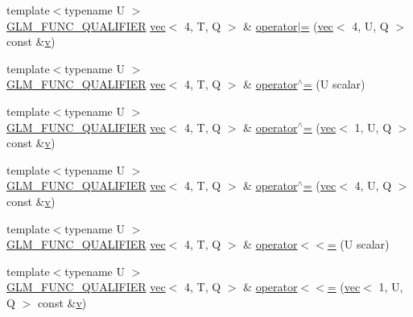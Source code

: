 \begin{DoxyCompactItemize}
\item 
{\footnotesize template$<$typename U $>$ }\\\hyperlink{setup_8hpp_a33fdea6f91c5f834105f7415e2a64407}{G\+L\+M\+\_\+\+F\+U\+N\+C\+\_\+\+Q\+U\+A\+L\+I\+F\+I\+ER} \hyperlink{structglm_1_1vec}{vec}$<$ 4, T, Q $>$ \& \hyperlink{structglm_1_1vec_3_014_00_01_t_00_01_q_01_4_aea8bc26beedb4f4fbb6a4d0ad4e02a86}{operator$\vert$=} (\hyperlink{structglm_1_1vec}{vec}$<$ 4, U, Q $>$ const \&\hyperlink{_s_d_l__opengl_8h_a10a82eabcb59d2fcd74acee063775f90}{v})
\item 
{\footnotesize template$<$typename U $>$ }\\\hyperlink{setup_8hpp_a33fdea6f91c5f834105f7415e2a64407}{G\+L\+M\+\_\+\+F\+U\+N\+C\+\_\+\+Q\+U\+A\+L\+I\+F\+I\+ER} \hyperlink{structglm_1_1vec}{vec}$<$ 4, T, Q $>$ \& \hyperlink{structglm_1_1vec_3_014_00_01_t_00_01_q_01_4_a123f810174d23a4d1b1eaf299a4e6f51}{operator$^\wedge$=} (U scalar)
\item 
{\footnotesize template$<$typename U $>$ }\\\hyperlink{setup_8hpp_a33fdea6f91c5f834105f7415e2a64407}{G\+L\+M\+\_\+\+F\+U\+N\+C\+\_\+\+Q\+U\+A\+L\+I\+F\+I\+ER} \hyperlink{structglm_1_1vec}{vec}$<$ 4, T, Q $>$ \& \hyperlink{structglm_1_1vec_3_014_00_01_t_00_01_q_01_4_a926de242b3187323bfc98e42863c23d3}{operator$^\wedge$=} (\hyperlink{structglm_1_1vec}{vec}$<$ 1, U, Q $>$ const \&\hyperlink{_s_d_l__opengl_8h_a10a82eabcb59d2fcd74acee063775f90}{v})
\item 
{\footnotesize template$<$typename U $>$ }\\\hyperlink{setup_8hpp_a33fdea6f91c5f834105f7415e2a64407}{G\+L\+M\+\_\+\+F\+U\+N\+C\+\_\+\+Q\+U\+A\+L\+I\+F\+I\+ER} \hyperlink{structglm_1_1vec}{vec}$<$ 4, T, Q $>$ \& \hyperlink{structglm_1_1vec_3_014_00_01_t_00_01_q_01_4_adfc4f1060841f2652c19c17d9980019a}{operator$^\wedge$=} (\hyperlink{structglm_1_1vec}{vec}$<$ 4, U, Q $>$ const \&\hyperlink{_s_d_l__opengl_8h_a10a82eabcb59d2fcd74acee063775f90}{v})
\item 
{\footnotesize template$<$typename U $>$ }\\\hyperlink{setup_8hpp_a33fdea6f91c5f834105f7415e2a64407}{G\+L\+M\+\_\+\+F\+U\+N\+C\+\_\+\+Q\+U\+A\+L\+I\+F\+I\+ER} \hyperlink{structglm_1_1vec}{vec}$<$ 4, T, Q $>$ \& \hyperlink{structglm_1_1vec_3_014_00_01_t_00_01_q_01_4_a2f063a4fd07698015d81f2a66023e021}{operator$<$$<$=} (U scalar)
\item 
{\footnotesize template$<$typename U $>$ }\\\hyperlink{setup_8hpp_a33fdea6f91c5f834105f7415e2a64407}{G\+L\+M\+\_\+\+F\+U\+N\+C\+\_\+\+Q\+U\+A\+L\+I\+F\+I\+ER} \hyperlink{structglm_1_1vec}{vec}$<$ 4, T, Q $>$ \& \hyperlink{structglm_1_1vec_3_014_00_01_t_00_01_q_01_4_a49e438063ef5c5937a048b268c29e628}{operator$<$$<$=} (\hyperlink{structglm_1_1vec}{vec}$<$ 1, U, Q $>$ const \&\hyperlink{_s_d_l__opengl_8h_a10a82eabcb59d2fcd74acee063775f90}{v})

\end{DoxyCompactItemize}
